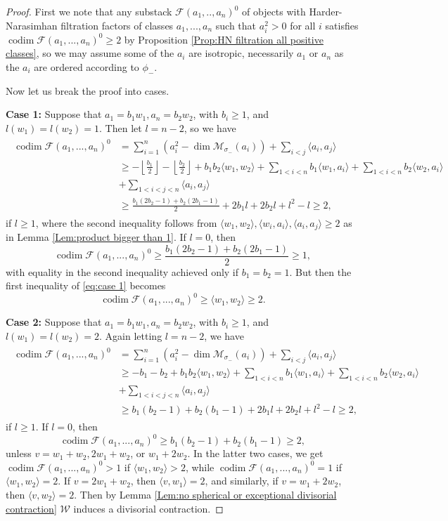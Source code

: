 \documentclass[leqno,11pt]{amsart}
\def\codim{\mathop{\mathrm{codim}}\nolimits}
\def\dim{\mathop{\mathrm{dim}}\nolimits}
\theoremstyle{definition}
\def\FF{\ensuremath{\mathcal F}}
\def\MM{\ensuremath{\mathcal M}}
\def\WW{\ensuremath{\mathcal W}}
\begin{document}
\begin{proof}
First we note that any substack $\FF(a_1,..,a_n)^0$ of objects with Harder-Narasimhan filtration factors of classes $a_1,...,a_n$ such that $a_i^2>0$ for all $i$ satisfies $\codim \FF(a_1,...,a_n)^0\geq 2$ by Proposition \ref{Prop:HN filtration all positive classes}, so we may assume some of the $a_i$ are isotropic, necessarily $a_1$ or $a_n$ as the $a_i$ are ordered according to $\phi_-$.

Now let us break the proof into cases.

\textbf{Case 1:} Suppose that $a_1=b_1w_1,a_n=b_2w_2$, with $b_i\geq 1$, and $l(w_1)=l(w_2)=1$.  Then let $l=n-2$, so we have \begin{align}\label{eq:case 1}
\begin{split}
\codim\FF(a_1,...,a_n)^0&=\sum_{i=1}^n(a_i^2-\dim\MM_{\sigma_-}(a_i))+\sum_{i<j}\langle a_i,a_j\rangle\\
&\geq-\left\lfloor\frac{b_1}{2}\right\rfloor-\left\lfloor\frac{b_2}{2}\right\rfloor+b_1 b_2\langle w_1,w_2\rangle+\sum_{1<i<n}b_1\langle w_1,a_i\rangle+\sum_{1<i<n}b_2\langle w_2,a_i\rangle\\
&+\sum_{1<i<j<n}\langle a_i,a_j\rangle\\
&\geq\frac{b_1(2b_2-1)+b_2(2b_1-1)}{2}+2b_1 l+2b_2 l+l^2-l\geq 2,
\end{split}
\end{align}
if $l\geq 1$, where the second inequality follows from $\langle w_1,w_2\rangle,\langle w_i,a_i\rangle,\langle a_i,a_j\rangle\geq 2$ as in Lemma \ref{Lem:product bigger than 1}.  If $l=0$, then $$\codim\FF(a_1,...,a_n)^0\geq\frac{b_1(2b_2-1)+b_2(2b_1-1)}{2}\geq 1,$$ with equality in the second inequality achieved only if $b_1=b_2=1$.  But then the first inequality of \eqref{eq:case 1} becomes $$\codim\FF(a_1,...,a_n)^0\geq \langle w_1,w_2\rangle\geq 2.$$

\textbf{Case 2:} Suppose that $a_1=b_1w_1,a_n=b_2w_2$, with $b_i\geq 1$, and $l(w_1)=l(w_2)=2$.  Again letting $l=n-2$, we have \begin{align}\label{eq:case 2}
\begin{split}
\codim\FF(a_1,...,a_n)^0&=\sum_{i=1}^n(a_i^2-\dim\MM_{\sigma_-}(a_i))+\sum_{i<j}\langle a_i,a_j\rangle\\
&\geq-b_1-b_2+b_1 b_2\langle w_1,w_2\rangle+\sum_{1<i<n}b_1\langle w_1,a_i\rangle+\sum_{1<i<n}b_2\langle w_2,a_i\rangle\\
&+\sum_{1<i<j<n}\langle a_i,a_j\rangle\\
&\geq b_1(b_2-1)+b_2(b_1-1)+2b_1 l+2b_2 l+l^2-l\geq 2,
\end{split}
\end{align}
if $l\geq 1$.  If $l=0$, then $$\codim\FF(a_1,...,a_n)^0\geq b_1(b_2-1)+b_2(b_1-1)\geq 2,$$ unless $v=w_1+w_2,2w_1+w_2$, or $w_1+2w_2$.  In the latter two cases, we get $\codim\FF(a_1,...,a_n)^0>1$ if $\langle w_1,w_2\rangle>2$, while $\codim\FF(a_1,...,a_n)^0=1$ if $\langle w_1,w_2\rangle=2$.  If $v=2w_1+w_2$, then $\langle v,w_1\rangle=2$, and similarly, if $v=w_1+2w_2$, then $\langle v,w_2\rangle=2$.  Then by Lemma \ref{Lem:no spherical or exceptional divisorial contraction} $\WW$ induces a divisorial contraction.  


\end{proof}
\end{document}
